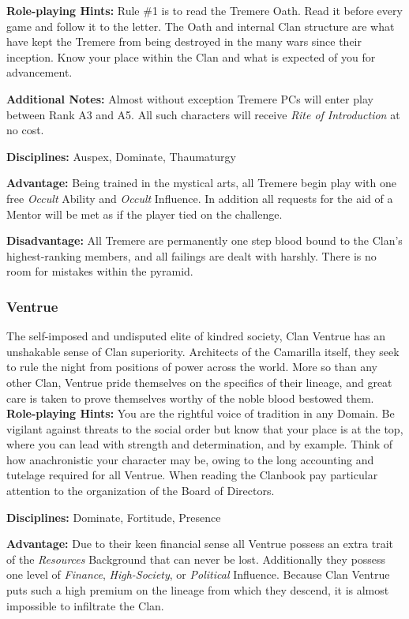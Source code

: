 \textbf{Role-playing Hints:}  Rule \#1 is to read the Tremere Oath.  Read it before 
every game and follow it to the letter.  The Oath and internal Clan structure are 
what have kept the Tremere from being destroyed in the many wars since their 
inception.  Know your place within the Clan and what is expected of you for advancement.

\textbf{Additional Notes:}  Almost without exception Tremere PCs will enter play 
between Rank A3 and A5.  All such characters will receive \emph{Rite of Introduction} 
at no cost.

\textbf{Disciplines:}  Auspex, Dominate, Thaumaturgy

\textbf{Advantage:}  Being trained in the mystical arts, all Tremere begin play 
with one free \emph{Occult} Ability and \emph{Occult} Influence.  In addition all 
requests for the aid of a Mentor will be met as if the player tied on the challenge.

\textbf{Disadvantage:}  All Tremere are permanently one step blood bound to the Clan's 
highest-ranking members, and all failings are dealt with harshly.  There is no room 
for mistakes within the pyramid.

\subsubsection{Ventrue}
The self-imposed and undisputed elite of kindred society, Clan Ventrue has an 
unshakable sense of Clan superiority.  Architects of the Camarilla itself, they 
seek to rule the night from positions of power across the world.  More so than 
any other Clan, Ventrue pride themselves on the specifics of their lineage, and 
great care is taken to prove themselves worthy of the noble blood bestowed them. \\

\textbf{Role-playing Hints:}  You are the rightful voice of tradition in any 
Domain.  Be vigilant against threats to the social order but know that your place 
is at the top, where you can lead with strength and determination, and by example.  
Think of how anachronistic your character may be, owing to the long accounting and 
tutelage required for all Ventrue.  When reading the Clanbook pay particular 
attention to the organization of the Board of Directors.

\textbf{Disciplines:}  Dominate, Fortitude, Presence

\textbf{Advantage:}  Due to their keen financial sense all Ventrue possess an 
extra trait of the \emph{Resources} Background that can never be lost.  Additionally 
they possess one level of \emph{Finance}, \emph{High-Society}, or \emph{Political} 
Influence.  Because Clan Ventrue puts such a high premium on the lineage from which 
they descend, it is almost impossible to infiltrate the Clan.

